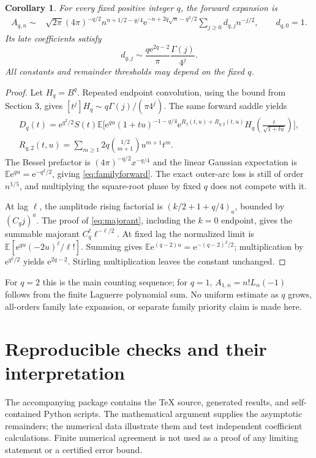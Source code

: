 \documentclass[11pt,letterpaper]{article}
\numberwithin{equation}{section}
\newtheorem{corollary}[theorem]{Corollary}
\theoremstyle{remark}\newtheorem{remark}[theorem]{Remark}
\newcommand{\E}{\mathbb E}
\newcommand{\e}{\mathrm e}
\begin{document}
\begin{corollary}\label{cor:family}
For every fixed positive integer $q$, the forward expansion is
\begin{align}\label{eq:familyforward}
 A_{q,n}\sim{}&\sqrt{2\pi}(4\pi)^{-q/2}
 n^{n+1/2-q/4}\e^{-n+2q\sqrt n-q^2/2}
 \sum_{j\ge0}d_{q,j}n^{-j/2},\qquad d_{q,0}=1.
\end{align}
Its late coefficients satisfy
\begin{equation}\label{eq:familylate}
 d_{q,j}\sim\frac{q\e^{2q-2}}\pi\frac{\Gamma(j)}{4^j}.
\end{equation}
All constants and remainder thresholds may depend on the fixed $q$.
\end{corollary}
\begin{proof}
Let $H_q=B^q$. Repeated endpoint convolution, using the bound from Section 3, gives $[t^j]H_q\sim q\Gamma(j)/(\pi4^j)$. The same forward saddle yields
\begin{align*}
 D_q(t)=\e^{q^2/2}S(t)\E\biggl[\e^{qu}(1+tu)^{-1-q/4}
 \e^{R_1(t,u)+R_{q,2}(t,u)}
 H_q\!\left(\frac{t}{\sqrt{1+tu}}\right)\biggr],\\
 R_{q,2}(t,u)=\sum_{m\ge1}2q\binom{1/2}{m+1}u^{m+1}t^m.
\end{align*}
The Bessel prefactor is $(4\pi)^{-q/2}x^{-q/4}$ and the linear Gaussian expectation is $\E\e^{qu}=\e^{-q^2/2}$, giving \eqref{eq:familyforward}. The exact outer-arc loss is still of order $n^{1/5}$, and multiplying the square-root phase by fixed $q$ does not compete with it.

At lag $\ell$, the amplitude rising factorial is $(k/2+1+q/4)_a$, bounded by $(C_q j)^a$. The proof of \eqref{eq:majorant}, including the $k=0$ endpoint, gives the summable majorant $C_q^\ell\ell^{-\ell/2}$. At fixed lag the normalized limit is $\E[\e^{qu}(-2u)^\ell/\ell!]$. Summing gives $\E\e^{(q-2)u}=\e^{-(q-2)^2/2}$; multiplication by $\e^{q^2/2}$ yields $\e^{2q-2}$. Stirling multiplication leaves the constant unchanged.
\end{proof}
For $q=2$ this is the main counting sequence; for $q=1$, $A_{1,n}=n!L_n(-1)$ follows from the finite Laguerre polynomial sum. No uniform estimate as $q$ grows, all-orders family late expansion, or separate family priority claim is made here.

\section{Reproducible checks and their interpretation}
The accompanying package contains the TeX source, generated results, and self-contained Python scripts. The mathematical argument supplies the asymptotic remainders; the numerical data illustrate them and test independent coefficient calculations. Finite numerical agreement is not used as a proof of any limiting statement or a certified error bound.
\end{document}
